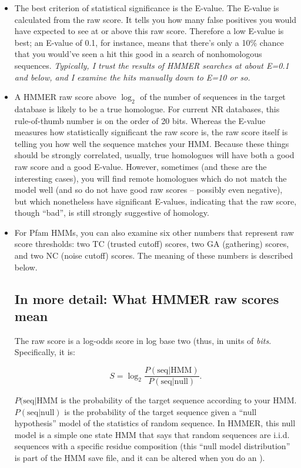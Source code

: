 \begin{itemize}

\item The best criterion of statistical significance is the E-value.
The E-value is calculated from the raw score. It tells you how many
false positives you would have expected to see at or above this raw
score. Therefore a low E-value is best; an E-value of 0.1, for
instance, means that there's only a 10\% chance that you would've seen
a hit this good in a search of nonhomologous sequences. {\em
Typically, I trust the results of HMMER searches at about E=0.1 and
below, and I examine the hits manually down to E=10 or so.}

\item A HMMER raw score above $\log_2$ of the number of sequences
in the target database is likely to be a true homologue. For current
NR databases, this rule-of-thumb number is on the order of 20 bits.
Whereas the E-value measures how statistically significant the raw
score is, the raw score itself is telling you how well the sequence
matches your HMM. Because these things should be strongly correlated,
usually, true homologues will have both a good raw score and a good
E-value. However, sometimes (and these are the interesting cases), you
will find remote homologues which do not match the model well (and so
do not have good raw scores -- possibly even negative), but which
nonetheless have significant E-values, indicating that the raw score,
though ``bad'', is still strongly suggestive of homology.

\item For Pfam HMMs, you can also examine six other numbers that
represent raw score thresholds: two TC (trusted cutoff) scores, two GA
(gathering) scores, and two NC (noise cutoff) scores. The meaning of
these numbers is described below.

\subsection{In more detail: What HMMER raw scores mean}

The raw score is a log-odds score in log base two (thus, in units of
{\em bits}. Specifically, it is:

\[
	S = \log_2 \frac {P( \mbox{seq} | \mbox{HMM})} { P (\mbox{seq} |
	\mbox{null})}.
\]

$P( \mbox{seq} | \mbox{HMM}$ is the probability of the target sequence
according to your HMM. $ P (\mbox{seq} | \mbox{null}) $ is the
probability of the target sequence given a ``null hypothesis'' model
of the statistics of random sequence. In HMMER, this null model is a
simple one state HMM that says that random sequences are i.i.d.
sequences with a specific residue composition (this ``null model
distribution'' is part of the HMM save file, and it can be altered
when you do an ).


\end{itemize}

